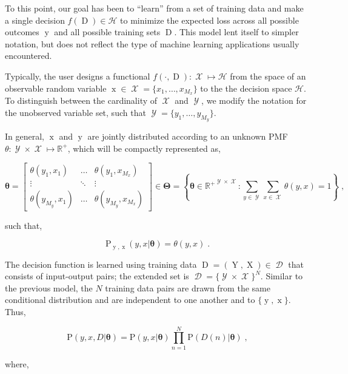 \documentclass[12pt]{report}
\DeclareMathOperator{\xrm}{\mathrm{x}}
\DeclareMathOperator{\Xrm}{\mathrm{X}}
\DeclareMathOperator{\yrm}{\mathrm{y}}
\DeclareMathOperator{\Yrm}{\mathrm{Y}}
\DeclareMathOperator{\Drm}{\mathrm{D}}
\DeclareMathOperator{\Xcal}{\mathcal{X}}
\DeclareMathOperator{\Ycal}{\mathcal{Y}}
\DeclareMathOperator{\Dcal}{\mathcal{D}}
\begin{document}
To this point, our goal has been to ``learn'' from a set of training data and make a single decision $f(\Drm) \in \mathcal{H}$ to minimize the expected loss across all possible outcomes $\yrm$ and all possible training sets $\Drm$. This model lent itself to simpler notation, but does not reflect the type of machine learning applications usually encountered. 

Typically, the user designs a functional $f(\cdot,\Drm): \Xcal \mapsto \mathcal{H}$ from the space of an observable random variable $\xrm \in \Xcal = \{x_1,\ldots,x_{M_x}\}$ to the the decision space $\mathcal{H}$. To distinguish between the cardinality of $\Xcal$ and $\Ycal$, we modify the notation for the unobserved variable set, such that $\Ycal = \{y_1,\ldots,y_{M_y}\}$. 

In general, $\xrm$ and $\yrm$ are jointly distributed according to an unknown PMF $\theta : \Ycal \times \Xcal \mapsto \mathbb{R}^+$, which will be compactly represented as,

\begin{equation}
\bm{\theta} = \begin{bmatrix} \theta(y_1,x_1) & \ldots & \theta(y_1,x_{M_x}) \\ \vdots & \ddots & \vdots \\ \theta(y_{M_y},x_1) & \ldots & \theta(y_{M_y},x_{M_x}) \end{bmatrix} 
\in \bm{\Theta} = \left\{ \bm{\theta} \in {\mathbb{R}^+}^{\Ycal \times \Xcal}: \sum_{y \in \Ycal} \sum_{x \in \Xcal}  \theta(y,x) = 1 \right\} \;,
\end{equation}

such that,

\begin{equation}
\text{P}_{\yrm,\xrm}(y,x | \bm{\theta}) = \theta(y,x) \;.
\end{equation}

The decision function is learned using training data $\Drm = ( \Yrm,\Xrm ) \in \Dcal$ that consists of input-output pairs; the extended set is $\Dcal = \{\Ycal \times \Xcal\}^N$. Similar to the previous model, the $N$ training data pairs are drawn from the same conditional distribution and are independent to one another and to $\{\yrm,\xrm\}$. Thus,

\begin{equation}
\text{P}(y,x,D | \bm{\theta}) = \text{P}(y,x | \bm{\theta}) \prod_{n=1}^N \text{P}(D(n) | \bm{\theta}) \;,
\end{equation}

where,
\end{document}
